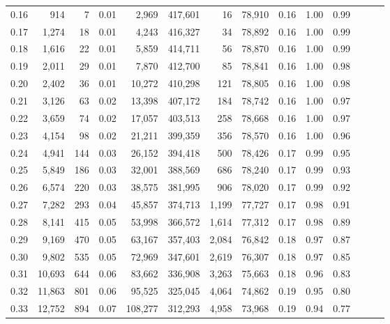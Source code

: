 \begin{tabular}{rrrrrrrrrrrrrr}
0.16 &     914 &      7 &  0.01 &    2,969 &  417,601 &      16 &  78,910 &  0.16 &  1.00 &      0.99 \\
0.17 &   1,274 &     18 &  0.01 &    4,243 &  416,327 &      34 &  78,892 &  0.16 &  1.00 &      0.99 \\
0.18 &   1,616 &     22 &  0.01 &    5,859 &  414,711 &      56 &  78,870 &  0.16 &  1.00 &      0.99 \\
0.19 &   2,011 &     29 &  0.01 &    7,870 &  412,700 &      85 &  78,841 &  0.16 &  1.00 &      0.98 \\
0.20 &   2,402 &     36 &  0.01 &   10,272 &  410,298 &     121 &  78,805 &  0.16 &  1.00 &      0.98 \\
0.21 &   3,126 &     63 &  0.02 &   13,398 &  407,172 &     184 &  78,742 &  0.16 &  1.00 &      0.97 \\
0.22 &   3,659 &     74 &  0.02 &   17,057 &  403,513 &     258 &  78,668 &  0.16 &  1.00 &      0.97 \\
0.23 &   4,154 &     98 &  0.02 &   21,211 &  399,359 &     356 &  78,570 &  0.16 &  1.00 &      0.96 \\
0.24 &   4,941 &    144 &  0.03 &   26,152 &  394,418 &     500 &  78,426 &  0.17 &  0.99 &      0.95 \\
0.25 &   5,849 &    186 &  0.03 &   32,001 &  388,569 &     686 &  78,240 &  0.17 &  0.99 &      0.93 \\
0.26 &   6,574 &    220 &  0.03 &   38,575 &  381,995 &     906 &  78,020 &  0.17 &  0.99 &      0.92 \\
0.27 &   7,282 &    293 &  0.04 &   45,857 &  374,713 &   1,199 &  77,727 &  0.17 &  0.98 &      0.91 \\
0.28 &   8,141 &    415 &  0.05 &   53,998 &  366,572 &   1,614 &  77,312 &  0.17 &  0.98 &      0.89 \\
0.29 &   9,169 &    470 &  0.05 &   63,167 &  357,403 &   2,084 &  76,842 &  0.18 &  0.97 &      0.87 \\
0.30 &   9,802 &    535 &  0.05 &   72,969 &  347,601 &   2,619 &  76,307 &  0.18 &  0.97 &      0.85 \\
0.31 &  10,693 &    644 &  0.06 &   83,662 &  336,908 &   3,263 &  75,663 &  0.18 &  0.96 &      0.83 \\
0.32 &  11,863 &    801 &  0.06 &   95,525 &  325,045 &   4,064 &  74,862 &  0.19 &  0.95 &      0.80 \\
0.33 &  12,752 &    894 &  0.07 &  108,277 &  312,293 &   4,958 &  73,968 &  0.19 &  0.94 &      0.77 \\

\end{tabular}
